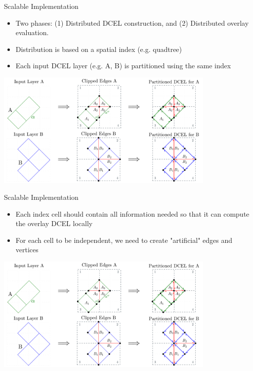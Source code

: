     \begin{frame}{Scalable Implementation}
        \begin{itemize}
            \small
            \item Two phases: (1) Distributed DCEL construction, and (2) Distributed overlay evaluation.
            \item Distribution is based on a spatial index (e.g. quadtree)
            \item Each input DCEL layer (e.g. A, B) is partitioned using the same index
        \end{itemize}
        \vspace{0.25cm}

        \centering
        \includegraphics[width=0.8\textwidth]{../thesis/chapterSDCEL/partition_schema/PolygonsParted}
    \end{frame}

    \begin{frame}{Scalable Implementation}
        \begin{itemize}
            \small
            \item Each index cell should contain all information needed so that it can compute the overlay DCEL locally
            \item For each cell to be independent, we need to create "artificial" edges and vertices
        \end{itemize}
        \vspace{0.25cm}

        \centering
        \includegraphics[width=0.8\textwidth]{../thesis/chapterSDCEL/partition_schema/PolygonsParted}
    \end{frame}

